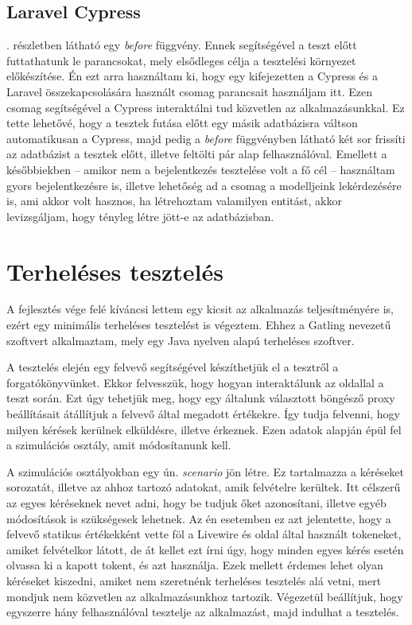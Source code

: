 \documentclass[
]{thesis-ekf}
\theoremstyle{definition}
\theoremstyle{remark}
\begin{document}


\subsection{Laravel Cypress}

. részletben látható egy \emph{before} függvény. Ennek segítségével a teszt előtt futtathatunk le parancsokat, mely elsődleges célja a tesztelési környezet előkészítése. Én ezt arra használtam ki, hogy egy kifejezetten a Cypress és a Laravel összekapcsolására használt csomag\cite{laravelCypress} parancsait használjam itt. Ezen csomag segítségével a Cypress interaktálni tud közvetlen az alkalmazásunkkal. Ez tette lehetővé, hogy a tesztek futása előtt egy másik adatbázisra váltson automatikusan a Cypress, majd pedig a \emph{before} függvényben látható két sor frissíti az adatbázist a tesztek előtt, illetve feltölti pár alap felhasználóval. Emellett a későbbiekben -- amikor nem a bejelentkezés tesztelése volt a fő cél -- használtam gyors bejelentkezésre is, illetve lehetőség ad a csomag a modelljeink lekérdezésére is, ami akkor volt hasznos, ha létrehoztam valamilyen entitást, akkor levizsgáljam, hogy tényleg létre jött-e az adatbázisban.

\section{Terheléses tesztelés}

A fejlesztés vége felé kíváncsi lettem egy kicsit az alkalmazás teljesítményére is, ezért egy minimális terheléses tesztelést is végeztem. Ehhez a Gatling\cite{gatling} nevezetű szoftvert alkalmaztam, mely egy Java nyelven alapú terheléses szoftver.

A tesztelés elején egy felvevő segítségével készíthetjük el a tesztről a forgatókönyvünket. Ekkor felvesszük, hogy hogyan interaktálunk az oldallal a teszt során. Ezt úgy tehetjük meg, hogy egy általunk választott böngésző proxy beállításait átállítjuk a felvevő által megadott értékekre. Így tudja felvenni, hogy milyen kérések kerülnek elküldésre, illetve érkeznek. Ezen adatok alapján épül fel a szimulációs osztály, amit módosítanunk kell.\cite{gatlingRecorder}

A szimulációs osztályokban egy ún. \emph{scenario} jön létre. Ez tartalmazza a kéréseket sorozatát, illetve az ahhoz tartozó adatokat, amik felvételre kerültek. Itt célszerű az egyes kéréseknek nevet adni, hogy be tudjuk őket azonosítani, illetve egyéb módosítások is szükségesek lehetnek. Az én esetemben ez azt jelentette, hogy a felvevő statikus értékekként vette föl a Livewire és oldal által használt tokeneket, amiket felvételkor látott, de át kellet ezt írni úgy, hogy minden egyes kérés esetén olvassa ki a kapott tokent, és azt használja. Ezek mellett érdemes lehet olyan kéréseket kiszedni, amiket nem szeretnénk terheléses tesztelés alá vetni, mert mondjuk nem közvetlen az alkalmazásunkhoz tartozik. Végezetül beállítjuk, hogy egyszerre hány felhasználóval tesztelje az alkalmazást, majd indulhat a tesztelés.\cite{gatlingScenario}
\end{document}
